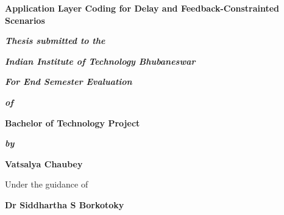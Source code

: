 \begin{titlepage}
\thispagestyle{empty}
\begin{center}
{\Large  \bf Application Layer Coding for Delay and Feedback-Constrainted Scenarios}
\end{center}
 \vspace{2em}
\begin{center}
 \textbf{\textit{Thesis submitted to the}}
\end{center}
 \vspace{-3em}
\begin{center}
 \textbf{\textit{Indian Institute of Technology  Bhubaneswar}} 
\end{center}
 \vspace{-3em}
\begin{center}
 \textbf{\textit{For End Semester Evaluation}} 
\end{center}
 \vspace{-1em}
\begin{center}
 \textbf{\textit{of}}
\end{center}
 \vspace{-1em}
\begin{center}
 \textbf{\large Bachelor of Technology Project}
\end{center}
 \vspace{-1em}
\begin{center}
 \textbf{\textit{by}}
\end{center}
 \vspace{-1em}
\begin{center}
 \large{\textbf{Vatsalya Chaubey}}
\end{center}
 \vspace{-1em}
\begin{center}
 Under the guidance of
\end{center}
 \vspace{-1em}
\begin{center}
 \textbf{Dr Siddhartha S Borkotoky}
\end{center}
 \vspace{-1em}
\begin{center}

\end{center}
\end{titlepage}
